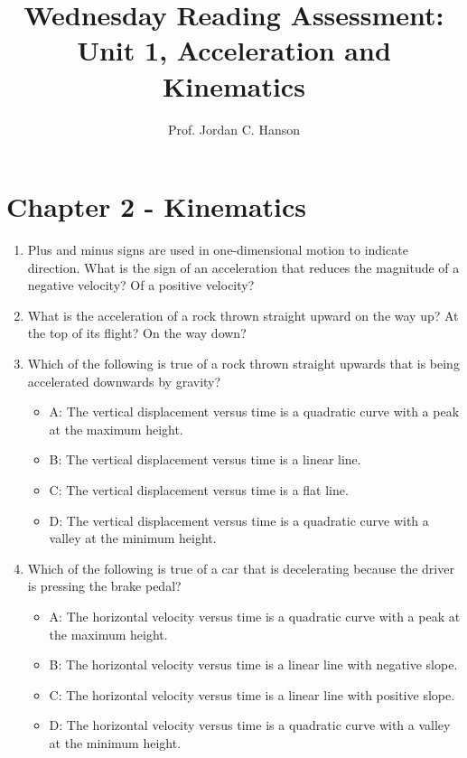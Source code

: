 \documentclass{article}
\begin{document}
\title{Wednesday Reading Assessment: Unit 1, Acceleration and Kinematics}
\author{Prof. Jordan C. Hanson}

\maketitle

\section{Chapter 2 - Kinematics}

\begin{enumerate}
\item Plus and minus signs are used in one-dimensional motion to indicate direction. What is the sign of an acceleration that
reduces the magnitude of a negative velocity? Of a positive velocity? \\ \vspace{3cm}
\item What is the acceleration of a rock thrown straight upward on the way up? At the top of its flight? On the way down? \\ \vspace{3cm}
\item Which of the following is true of a rock thrown straight upwards that is being accelerated downwards by gravity?
\begin{itemize}
\item A: The vertical displacement versus time is a quadratic curve with a peak at the maximum height.
\item B: The vertical displacement versus time is a linear line.
\item C: The vertical displacement versus time is a flat line.
\item D: The vertical displacement versus time is a quadratic curve with a valley at the minimum height.
\end{itemize}
\item Which of the following is true of a car that is decelerating because the driver is pressing the brake pedal?
\begin{itemize}
\item A: The horizontal velocity versus time is a quadratic curve with a peak at the maximum height.
\item B: The horizontal velocity versus time is a linear line with negative slope.
\item C: The horizontal velocity versus time is a linear line with positive slope.
\item D: The horizontal velocity versus time is a quadratic curve with a valley at the minimum height.
\end{itemize}
\end{enumerate}
\end{document}
